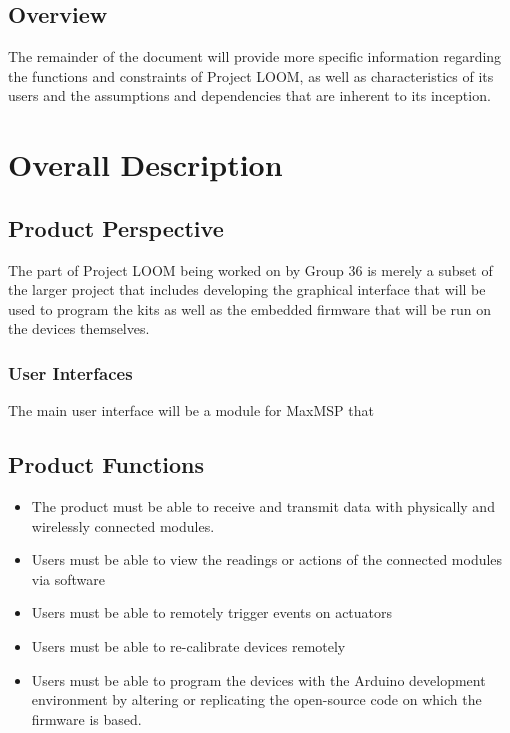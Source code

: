 \documentclass[onecolumn, draftclsnofoot,10pt, compsoc]{IEEEtran}
\begin{document}
	\subsection{Overview}
	The remainder of the document will provide more specific information regarding the functions and constraints of Project LOOM, as well as characteristics of its users and the assumptions and dependencies that are inherent to its inception. 

\section{Overall Description}
	\subsection{Product Perspective}
	The part of Project LOOM being worked on by Group 36 is merely a subset of the larger project that includes developing the graphical interface that will be used to program the kits as well as the embedded firmware that will be run on the devices themselves.

	\subsubsection{User Interfaces}
	The main user interface will be a module for MaxMSP that 
	\subsection{Product Functions}
		\begin{itemize}
		\item The product must be able to receive and transmit data with physically and wirelessly connected modules.
		\item Users must be able to view the readings or actions of the connected modules via software
		\item Users must be able to remotely trigger events on actuators
		\item Users must be able to re-calibrate devices remotely
		\item Users must be able to program the devices with the Arduino development environment by altering or replicating the open-source code on which the firmware is based.
		\end{itemize}
\end{document}

